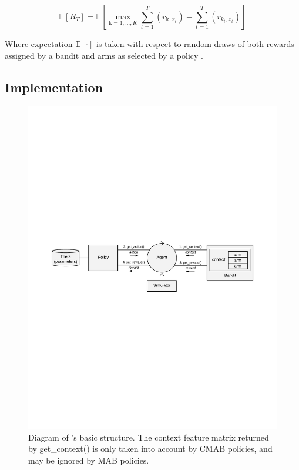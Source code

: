 \documentclass{jss}
\begin{document}
\begin{equation} \label{eq:2}
\mathbb{E}\left[R_{T} \right] = \mathbb{E}\left[  \max_{\mathrm{k} = 1, \dots, K} \sum^{T}_{t=1}(r_{\mathrm{k},x_t}) - \sum^{T}_{t=1}(r_{k_t,x_t})\right]
\end{equation}

Where expectation $\mathbb{E}\left[ \mathord{\cdot}\right]$ is taken with respect to random draws of both rewards assigned by a bandit and arms as selected by a policy \citep{Zheng2016a}.

\subsection{Implementation} \label{implementation}

\begin{figure}[H]
  \centering
    \includegraphics[width=.99\textwidth]{fig/CMAB_chart}

      \caption{Diagram of 's basic structure. The context feature matrix returned by get\_context() is only taken into account by CMAB policies, and may be ignored by MAB policies.}
      \label{fig:CMAB_chart}
\end{figure}
\end{document}
